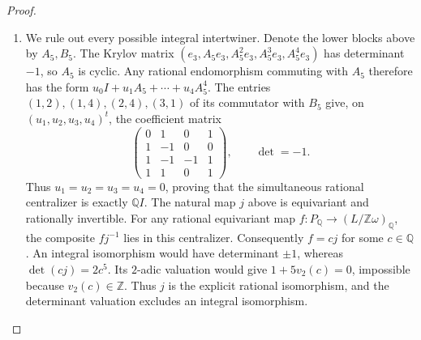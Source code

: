 \documentclass[11pt,a4paper]{article}
\numberwithin{equation}{section}
\theoremstyle{definition}
\begin{document}
\begin{proof}
\begin{enumerate}[label=\arabic*.]
\item We rule out every possible integral intertwiner.  Denote the lower blocks above by $A_5,B_5$.
The Krylov matrix $(e_3,A_5e_3,A_5^2e_3,A_5^3e_3,A_5^4e_3)$
has determinant $-1$, so $A_5$ is cyclic.  Any rational endomorphism
commuting with $A_5$ therefore has the form
$u_0I+u_1A_5+\cdots+u_4A_5^4$.
The entries $(1,2),(1,4),(2,4),(3,1)$ of its commutator with $B_5$
give, on $(u_1,u_2,u_3,u_4)^t$, the coefficient matrix
\[
\begin{pmatrix}
0&1&0&1\\1&-1&0&0\\1&-1&-1&1\\1&1&0&1
\end{pmatrix},\qquad \det=-1.
\]
Thus $u_1=u_2=u_3=u_4=0$, proving that the simultaneous rational
centralizer is exactly $\mathbb QI$.
The natural map $j$ above is equivariant and rationally invertible.
For any rational equivariant map $f:P_{\mathbb Q}\to
(L/\mathbb Z\omega)_{\mathbb Q}$, the composite $fj^{-1}$ lies
in this centralizer.  Consequently $f=cj$ for some $c\in\mathbb Q$.
An integral isomorphism would have determinant $\pm1$, whereas
$\det(cj)=2c^5$.  Its $2$-adic valuation would give
$1+5v_2(c)=0$, impossible because $v_2(c)\in\mathbb Z$.
Thus $j$ is the explicit rational isomorphism, and the determinant
valuation excludes an integral isomorphism.

\end{enumerate}
\end{proof}
\end{document}
